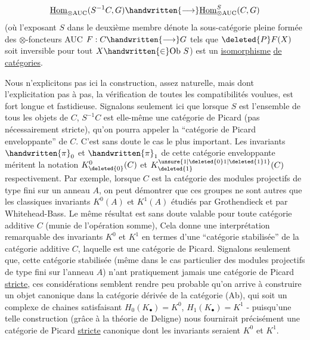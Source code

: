 \[
\underline{\mathrm{Hom}}_{\otimes\mathrm{AUC}}(S^{-1}C,G)\handwritten{\longrightarrow}\underline{\mathrm{Hom}}_{\otimes\mathrm{AUC}}^{S}(C,G)
\]
(où l'exposant $S$ dans le deuxième membre dénote la sous-catégorie pleine formée des $\otimes$-foncteurs AUC $F:C\handwritten{\longrightarrow}G$ tels que $\deleted{P}F(X)$ soit inversib\unsure{\textperiodcentered|-}le pour tout $X\handwritten{\in}\mathrm{Ob}\ S$) est un \uline{isomorphisme} \uline{de catégories}.

Nous n'explicitons pas ici la construction, assez naturelle, mais dont l'explicitation pas à pas,  la vérification de toutes les compatibilités voulues, est fort longue et fastidieuse. Signalons seulement ici que lorsque $S$ est l'ensemble de tous les objets de $C$, $S^{-1}C$ est elle-même une catégorie de Picard (pas nécessairement stricte), qu'on pourra appeler la ``catégorie de Picard enveloppante'' de $C$. C'est sans doute le cas le plus important. Les invariants $\handwritten{\pi}_{0}$ et $\handwritten{\pi}_{1}$ de cette catégorie enveloppante méritent la notation $K^{0}_{\deleted{0}}(C)$ et $K^{\unsure{1|\deleted{0}1|\deleted{1}1}}_{\deleted{1}}(C)$ respectivement. Par exemple, lorsque $C$ est la catégorie des modules projectifs de type fini sur un anneau $A$,  on peut démontrer que ces groupes ne sont autres que les classiques invariants $K^{0}(A)$ et $K^{1}(A)$ étudiés par Grothendieck et par Whitehead-Bass. Le même résultat est sans doute valable pour toute catégorie additive $C$ (munie de  l'opération somme), Cela donne une interprétation remarquable des invariants $K^{0}$ et $K^{1}$ en termes d'une ``catégorie stabilisée'' \handwritten{(}de la catégorie additive $C$\handwritten{)}, laquelle est une catégorie de Picard. Signalons seulement que, cette catégorie stabilisée (même dans le cas particulier des modules projectifs de type fini sur l'anneau $A$) n'ant pratiquement jamais une catégorie de Picard \uline{stricte}, ces considérations semblent rendre peu probable qu'on arrive à construire un objet canonique dans la catégorie dérivée de la catégorie (Ab), qui soit un complexe de chaines satisfaisant $H_{0}(K_{\bullet})=K^{0}$, $H_{1}(K_{\bullet})=K^{1}$ - puisqu'une telle construction (grâce à la théorie de Deligne) nous fournirait précisément une catégorie de Picard \uline{stricte} canonique dont les invariants seraient $K^{0}$ et $K^{1}$.


